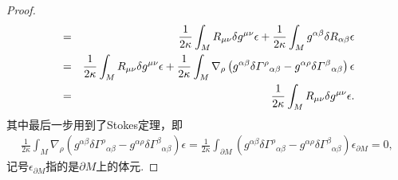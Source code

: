 \begin{proof}
\begin{eqnarray}
        &=&\frac{1}{2\kappa}\int_M{R}_{\mu\nu}\delta g^{\mu\nu}\epsilon+\frac{1}{2\kappa}\int_M g^{\alpha\beta}\delta {R}_{\alpha\beta}\epsilon\notag\\
        &=&\frac{1}{2\kappa}\int_M{R}_{\mu\nu}\delta g^{\mu\nu}\epsilon+\frac{1}{2\kappa}\int_M\nabla_\rho\left(g^{\alpha\beta}\delta{\varGamma^\rho}_{\alpha\beta}-g^{\alpha\rho}\delta{\varGamma^\beta}_{\alpha\beta}\right)\epsilon\notag\\
        &=&\frac{1}{2\kappa}\int_M{R}_{\mu\nu}\delta g^{\mu\nu}\epsilon.
    \end{eqnarray}
    其中最后一步用到了Stokes定理，即
    \begin{eqnarray*}
        \frac{1}{2\kappa}\int_M\nabla_\rho\left(g^{\alpha\beta}\delta{\varGamma^\rho}_{\alpha\beta}-g^{\alpha\rho}\delta{\varGamma^\beta}_{\alpha\beta}\right)\epsilon=\frac{1}{2\kappa}\int_{\partial M}\left(g^{\alpha\beta}\delta{\varGamma^\rho}_{\alpha\beta}-g^{\alpha\rho}\delta{\varGamma^\beta}_{\alpha\beta}\right)\epsilon_{\partial M}=0,
    \end{eqnarray*}
    记号$\epsilon_{\partial M}$指的是$\partial M$上的体元.


\end{proof}
